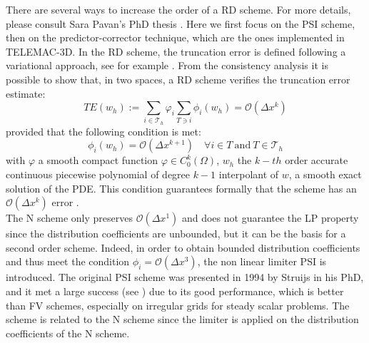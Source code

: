 There are several ways to increase the order of a RD scheme. For more details, please consult Sara Pavan's PhD thesis \cite{Pavan2016}. Here
we first focus on the PSI scheme, then on the predictor-corrector technique, which are the ones implemented in TELEMAC-3D.
In the RD scheme, the truncation error is defined following a variational approach, see for example \cite{abgrall_toward_2001,abgrall_high_2003,stein_residual_2007}.
From the consistency analysis it is possible to show that, in two spaces, a RD scheme verifies the truncation error
estimate:
\begin{equation}
 TE(w_h):=\sum\limits_{i \in \mathcal{T}_h} \varphi_i \sum \limits_{T \ni i} \phi_i(w_h)= \mathcal{O}(\Delta x^k)
\end{equation}
provided that the following condition is met:
\begin{equation}
 \phi_i(w_h)=\mathcal{O}(\Delta x^{k+1}) \quad \forall i \in T ~\text{and} ~T \in \mathcal{T}_h
\end{equation}
with $\varphi$ a smooth compact function $\varphi \in C_0^k(\Omega)$, $w_h$ the $k-th$ order accurate
continuous piecewise polynomial of degree $k-1$ interpolant of $w$, a smooth exact solution of the PDE.
This condition guarantees formally that the scheme has an $\mathcal{O}(\Delta x^k)$ error \cite{stein_residual_2007}. \\

The N scheme only preserves $\mathcal{O}(\Delta x^1)$ and does not guarantee the LP property since the distribution coefficients are unbounded,
but it can be the basis for a second order scheme. 
Indeed, in order to obtain bounded distribution coefficients and thus meet the condition $\phi_i=\mathcal{O}(\Delta x^{3})$,
the non linear limiter PSI is introduced. The original PSI scheme was presented in 1994 by Struijs
\citet{struijs} in his PhD, and it met a large success (see \cite{roe_linear_1987,roe_optimum_1992,paillere_multidimensional_1995}) due to its good performance,
which is better than FV schemes, especially on irregular grids \cite{stein_residual_2007} for steady scalar problems.
The scheme is related to the N scheme since the limiter is applied on the distribution coefficients of the N scheme. \\

